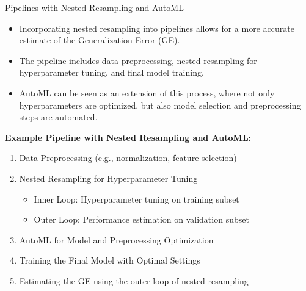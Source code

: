 \documentclass[11pt,compress,t,notes=noshow, xcolor=table]{beamer}
\begin{document}
\begin{vbframe}{Pipelines with Nested Resampling and AutoML}

\begin{itemize}
\item \small Incorporating nested resampling into pipelines allows for a more accurate estimate of the Generalization Error (GE).
\item \small The pipeline includes data preprocessing, nested resampling for hyperparameter tuning, and final model training.
\item \small AutoML can be seen as an extension of this process, where not only hyperparameters are optimized, but also model selection and preprocessing steps are automated.
\end{itemize}

\textbf{Example Pipeline with Nested Resampling and AutoML:}
\begin{enumerate}
\item Data Preprocessing (e.g., normalization, feature selection)
\item Nested Resampling for Hyperparameter Tuning
    \begin{itemize}
    \item \small Inner Loop: Hyperparameter tuning on training subset
    \item \small Outer Loop: Performance estimation on validation subset
    \end{itemize}
\item AutoML for Model and Preprocessing Optimization
\item Training the Final Model with Optimal Settings
\item Estimating the GE using the outer loop of nested resampling
\end{enumerate}

\end{vbframe}

\endlecture
\end{document}
